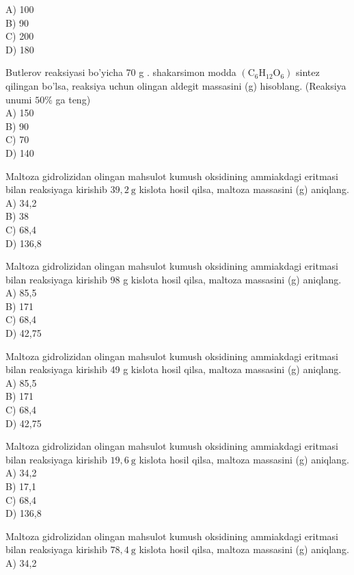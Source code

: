 A) 100\\
B) 90\\
C) 200\\
D) 180
  \item Butlerov reaksiyasi bo'yicha 70 g . shakarsimon modda $\left(\mathrm{C}_{6} \mathrm{H}_{12} \mathrm{O}_{6}\right)$ sintez qilingan bo'lsa, reaksiya uchun olingan aldegit massasini (g) hisoblang. (Reaksiya unumi $50 \%$ ga teng)\\
A) 150\\
B) 90\\
C) 70\\
D) 140
  \item Maltoza gidrolizidan olingan mahsulot kumush oksidining ammiakdagi eritmasi bilan reaksiyaga kirishib $39,2 \mathrm{~g}$ kislota hosil qilsa, maltoza massasini (g) aniqlang.\\
A) 34,2\\
B) 38\\
C) 68,4\\
D) 136,8
  \item Maltoza gidrolizidan olingan mahsulot kumush oksidining ammiakdagi eritmasi\\
bilan reaksiyaga kirishib 98 g kislota hosil qilsa, maltoza massasini (g) aniqlang.\\
A) 85,5\\
B) 171\\
C) 68,4\\
D) 42,75
  \item Maltoza gidrolizidan olingan mahsulot kumush oksidining ammiakdagi eritmasi bilan reaksiyaga kirishib 49 g kislota hosil qilsa, maltoza massasini (g) aniqlang.\\
A) 85,5\\
B) 171\\
C) 68,4\\
D) 42,75
  \item Maltoza gidrolizidan olingan mahsulot kumush oksidining ammiakdagi eritmasi bilan reaksiyaga kirishib $19,6 \mathrm{~g}$ kislota hosil qilsa, maltoza massasini (g) aniqlang.\\
A) 34,2\\
B) 17,1\\
C) 68,4\\
D) 136,8
  \item Maltoza gidrolizidan olingan mahsulot kumush oksidining ammiakdagi eritmasi bilan reaksiyaga kirishib $78,4 \mathrm{~g}$ kislota hosil qilsa, maltoza massasini (g) aniqlang.\\
A) 34,2\\

